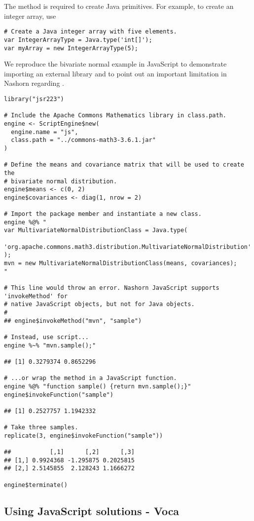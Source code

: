 The  method is required to create Java primitives. For example, to create an integer array, use

\begin{verbatim}
# Create a Java integer array with five elements.
var IntegerArrayType = Java.type('int[]');
var myArray = new IntegerArrayType(5); 
\end{verbatim}

We reproduce the bivariate normal example in JavaScript to demonstrate importing an external library and to point out an important limitation in Nashorn regarding .

\begin{verbatim}
library("jsr223")

# Include the Apache Commons Mathematics library in class.path.
engine <- ScriptEngine$new(
  engine.name = "js",
  class.path = "../commons-math3-3.6.1.jar"
)

# Define the means and covariance matrix that will be used to create the
# bivariate normal distribution.
engine$means <- c(0, 2)
engine$covariances <- diag(1, nrow = 2)

# Import the package member and instantiate a new class.
engine %@% "
var MultivariateNormalDistributionClass = Java.type(
  'org.apache.commons.math3.distribution.MultivariateNormalDistribution'
);
mvn = new MultivariateNormalDistributionClass(means, covariances);
"

# This line would throw an error. Nashorn JavaScript supports 'invokeMethod' for
# native JavaScript objects, but not for Java objects.
# 
## engine$invokeMethod("mvn", "sample")

# Instead, use script...
engine %~% "mvn.sample();"

## [1] 0.3279374 0.8652296

# ...or wrap the method in a JavaScript function.
engine %@% "function sample() {return mvn.sample();}"
engine$invokeFunction("sample")

## [1] 0.2527757 1.1942332

# Take three samples.
replicate(3, engine$invokeFunction("sample"))

##           [,1]      [,2]      [,3]
## [1,] 0.9924368 -1.295875 0.2025815
## [2,] 2.5145855  2.128243 1.1666272

engine$terminate()
\end{verbatim}

\subsection{Using JavaScript solutions - Voca}

